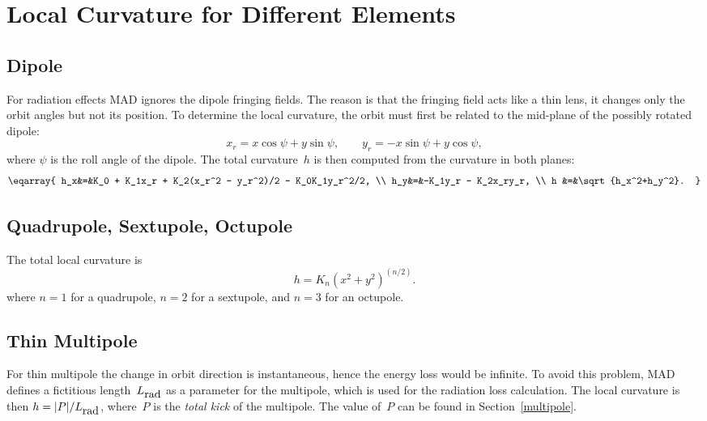  
\section{Local Curvature for Different Elements}
 
\subsection{Dipole}
For radiation effects MAD ignores the dipole fringing fields.
The reason is that the fringing field acts like a thin lens,
it changes only the orbit angles but not its position.
To determine the local curvature,
the orbit must first be related to the mid-plane of the possibly
rotated dipole:
\begin{equation}
x_r=x\cos\psi+y\sin\psi, \qquad y_r=-x\sin\psi+y\cos\psi,
\end{equation}
where $\psi$ is the roll angle of the dipole.
The total curvature~$h$ is then computed from the curvature in both
planes:
\begin{equation}\eqarray{
h_x&=&K_0 + K_1x_r + K_2(x_r^2 - y_r^2)/2 - K_0K_1y_r^2/2, \\
h_y&=&-K_1y_r - K_2x_ry_r, \\
h  &=&\sqrt{h_x^2+h_y^2}.
}\end{equation}
 
\subsection{Quadrupole, Sextupole, Octupole}
The total local curvature is
\begin{equation}
h=K_n (x^2 + y^2)^{(n/2)}.
\end{equation}
where $n=1$ for a quadrupole, $n=2$ for a sextupole, and $n=3$ for an
octupole.
 
\subsection{Thin Multipole}
For thin multipole the change in orbit direction is instantaneous,
hence the energy loss would be infinite.
To avoid this problem, MAD defines a fictitious
length~$L_{\hbox{rad}}$ as a parameter for the multipole, which is
used for the radiation loss calculation.
The local curvature is then $h = |P|/L_{\hbox{rad}}$,
where~$P$ is the {\em total kick} of the multipole.
The value of~$P$ can be found in Section~\ref{multipole}.
 
